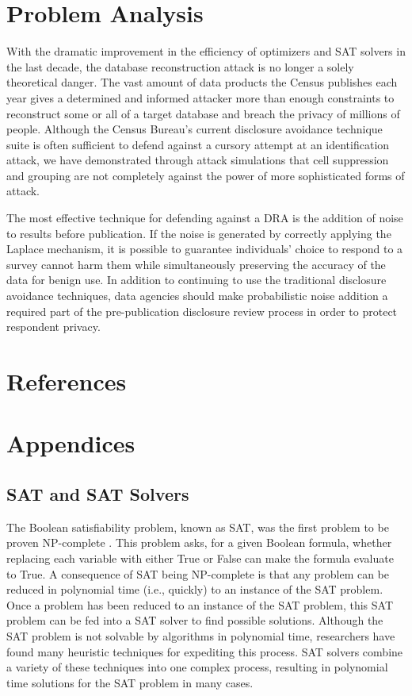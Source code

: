 \documentclass[5p,times,11pt]{elsarticle}
\begin{document}
\section{Problem Analysis}

With the dramatic improvement in the efficiency of optimizers and SAT solvers in the last decade, the database reconstruction attack is no longer a solely theoretical danger. The vast amount of data products the Census publishes each year gives a determined and informed attacker more than enough constraints to reconstruct some or all of a target database and breach the privacy of millions of people. Although the Census Bureau's current disclosure avoidance technique suite is often sufficient to defend against a cursory attempt at an identification attack, we have demonstrated through attack simulations that cell suppression and grouping are not completely against the power of more sophisticated forms of attack.

The most effective technique for defending against a DRA is the addition of noise to results before publication. If the noise is generated by correctly applying the Laplace mechanism, it is possible to guarantee individuals' choice to respond to a survey cannot harm them while simultaneously preserving the accuracy of the data for benign use. In addition to continuing to use the traditional disclosure avoidance techniques, data agencies should make probabilistic noise addition a required part of the pre-publication disclosure review process in order to protect respondent privacy.

\section{References}





\section{Appendices}

\subsection{SAT and SAT Solvers}

The Boolean satisfiability problem, known as SAT, was the first problem to be proven NP-complete \cite{cooklevin}. This problem asks, for a given Boolean formula, whether replacing each variable with either True or False can make the formula evaluate to True.   A consequence of SAT being NP-complete is that any problem can be reduced in polynomial time (i.e., quickly) to an instance of the SAT problem. Once a problem has been reduced to an instance of the SAT problem, this SAT problem can be fed into a SAT solver to find possible solutions. Although the SAT problem is not solvable by algorithms in polynomial time, researchers have found many heuristic techniques for expediting this process. SAT solvers combine a variety of these techniques into one complex process, resulting in polynomial time solutions for the SAT problem in many cases.
\end{document}
